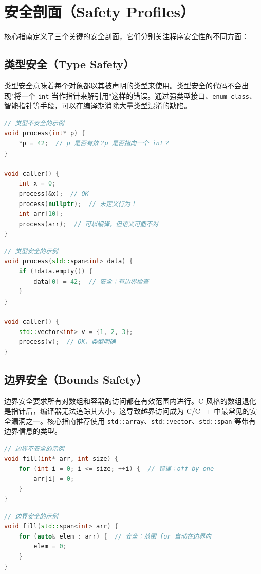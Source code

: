 \section{安全剖面（Safety Profiles）}

核心指南定义了三个关键的安全剖面，它们分别关注程序安全性的不同方面：

\subsection{类型安全（Type Safety）}

类型安全意味着每个对象都以其被声明的类型来使用。类型安全的代码不会出现"将一个 \texttt{int} 当作指针来解引用"这样的错误。通过强类型接口、\texttt{enum class}、智能指针等手段，可以在编译期消除大量类型混淆的缺陷。

\begin{lstlisting}[language=C++]
// 类型不安全的示例
void process(int* p) {
    *p = 42;  // p 是否有效？p 是否指向一个 int？
}

void caller() {
    int x = 0;
    process(&x);  // OK
    process(nullptr);  // 未定义行为！
    int arr[10];
    process(arr);  // 可以编译，但语义可能不对
}
\end{lstlisting}

\begin{lstlisting}[language=C++]
// 类型安全的示例
void process(std::span<int> data) {
    if (!data.empty()) {
        data[0] = 42;  // 安全：有边界检查
    }
}

void caller() {
    std::vector<int> v = {1, 2, 3};
    process(v);  // OK，类型明确
}
\end{lstlisting}

\subsection{边界安全（Bounds Safety）}

边界安全要求所有对数组和容器的访问都在有效范围内进行。C 风格的数组退化是指针后，编译器无法追踪其大小，这导致越界访问成为 C/C++ 中最常见的安全漏洞之一。核心指南推荐使用 \texttt{std::array}、\texttt{std::vector}、\texttt{std::span} 等带有边界信息的类型。

\begin{lstlisting}[language=C++]
// 边界不安全的示例
void fill(int* arr, int size) {
    for (int i = 0; i <= size; ++i) {  // 错误：off-by-one
        arr[i] = 0;
    }
}
\end{lstlisting}

\begin{lstlisting}[language=C++]
// 边界安全的示例
void fill(std::span<int> arr) {
    for (auto& elem : arr) {  // 安全：范围 for 自动在边界内
        elem = 0;
    }
}
\end{lstlisting}

